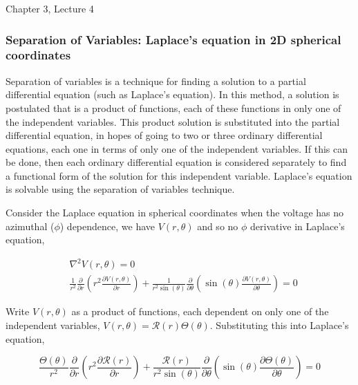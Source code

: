 \documentclass[12pt]{article}
\begin{document}
\begin{flushright} {\color{blue} Chapter 3, Lecture 4} \end{flushright}
\begin{flushleft}

\subsubsection*{\color{myblue} \bf Separation of Variables: Laplace's equation in 2D spherical coordinates}

Separation of variables is a technique for finding a solution to a partial differential equation (such as Laplace's equation).  In this method, a solution is postulated that is a product of functions, each of these functions in only one of the independent variables.  This product solution is substituted into the partial differential equation, in hopes of going to two or three ordinary differential equations, each one in terms of only one of the independent variables.  If this can be done, then each ordinary differential equation is considered separately to find a functional form of the solution for this independent variable.  Laplace's equation is solvable using the separation of variables technique.

Consider the Laplace equation in spherical coordinates when the voltage has no azimuthal ($\phi$) dependence, we have $V(r,\theta)$ and so no $\phi$ derivative in Laplace's equation,

\begin{equation*}
\begin{aligned}
& \nabla^{2}V(r,\theta) = 0 \\[6pt]
& \frac{1}{r^{2}}\frac{\partial}{\partial r}\left( r^{2} \frac{\partial V(r,\theta)}{\partial r} \right) + \frac{1}{r^{2}\sin{(\theta)}} \frac{\partial}{\partial \theta} \left(\sin{(\theta)} \frac{\partial V(r,\theta)}{\partial \theta} \right) = 0
\end{aligned}
\end{equation*}

Write $V(r,\theta)$ as a product of functions, each dependent on only one of the independent variables, $V(r,\theta)=\mathcal{R}(r)\Theta(\theta)$.  Substituting this into Laplace's equation,

\begin{equation}
\frac{\Theta(\theta)}{r^{2}}\frac{\partial}{\partial r}\left( r^{2} \frac{\partial \mathcal{R}(r)}{\partial r} \right) + \frac{\mathcal{R}(r)}{r^{2}\sin{(\theta)}} \frac{\partial}{\partial \theta} \left(\sin{(\theta)} \frac{\partial \Theta(\theta)}{\partial \theta} \right) = 0 
\label{eq:productthere}
\end{equation}


\end{flushleft}
\end{document}
